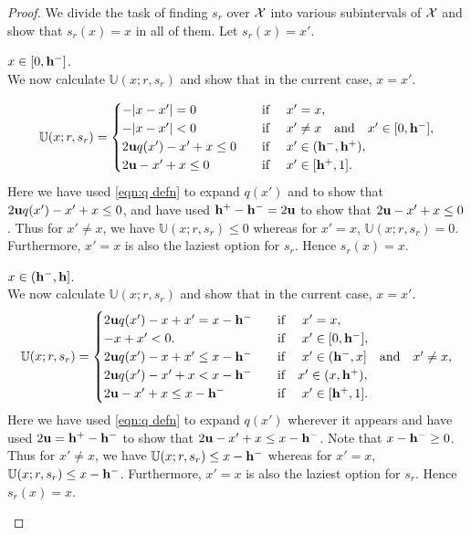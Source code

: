 \begin{proof}\label{proof:error is half}
    We divide the task of finding $ s_r $ over $ \mathcal{X} $ into various subintervals of $ \mathcal{X} $ and show that $s_r(x) = x$ in all of them.  Let $s_r(x) = x'$.

    \begin{case} $ x \in [0,\mathbf{h^{-}}] $.\\
 We now calculate $\mathbb{U}(x;r,s_r)$ and show that in the current case, $x=x'$.

\begin{equation*}
    \mathbb{U}(x;r,s_r) = \begin{cases}
    -|x-x'| = 0 &\hbox{\quad if \quad} x'= x,\\
    -|x-x'| < 0 &\hbox{\quad if \quad} x'\neq x \hbox{\quad and\quad} x' \in [0,\mathbf{h^{-}}],\\
    2\mathbf{u} q(x') - x' + x \leq 0 &\hbox{\quad if \quad} x' \in (\mathbf{h^{-}},\mathbf{h^{+}}),\\
    2\mathbf{u} - x' + x \leq 0&\hbox{\quad if \quad} x' \in [\mathbf{h^{+}},1].
    \end{cases}
\end{equation*}
Here we have used \eqref{eqn:q defn} to expand $q(x')$ and to show that  $2\mathbf{u} q(x') - x' + x \leq 0$, and have used $\mathbf{h^{+}} - \mathbf{h^{-}} = 2\mathbf{u}$ to show that $2\mathbf{u} -x' + x \leq 0$.
Thus for $x' \neq x$, we have $\mathbb{U}(x;r,s_r) \leq 0$ whereas for $x' = x$, $\mathbb{U}(x;r,s_r) = 0$. Furthermore, $x'=x$ is also the laziest option for $s_r$. Hence $s_r(x) = x$.
\end{case}

\begin{case}$ x \in (\mathbf{h^{-}},\mathbf{h}] $.\\
 We now calculate $\mathbb{U}(x;r,s_r)$ and show that in the current case, $x=x'$.
 \begin{equation*}
    \mathbb{U}(x;r,s_r) = \begin{cases}
    2\mathbf{u} q(x') - x + x' = x - \mathbf{h^{-}} &\hbox{\quad if \quad} x'= x,\\
    -x + x' < 0. &\hbox{\quad if \quad} x' \in [0,\mathbf{h^{-}}],\\
    2\mathbf{u} q(x') - x + x' \leq x- \mathbf{h^{-}} &\hbox{\quad if \quad} x' \in (\mathbf{h^{-}},x] \hbox{\quad and\quad} x' \neq x,\\
    2\mathbf{u} q(x') - x' + x < x-\mathbf{h^{-}}    &\hbox{\quad if\quad} x' \in (x,\mathbf{h^{+}}),\\
    2\mathbf{u} - x' + x \leq x - \mathbf{h^{-}} &\hbox{\quad if \quad} x' \in [\mathbf{h^{+}},1].
    \end{cases}
\end{equation*}
Here we have used \eqref{eqn:q defn} to expand $q(x')$ wherever it appears and have used $2\mathbf{u} = \mathbf{h^{+}} - \mathbf{h^{-}}$ to show that $2\mathbf{u} -x' + x \leq x - \mathbf{h^{-}}$. Note that $x - \mathbf{h^{-}} \geq 0$.
Thus for $x' \neq x$, we have $\mathbb{U}(x;r,s_r) \leq x-\mathbf{h^{-}}$ whereas for $x' = x$, $\mathbb{U}(x;r,s_r) \leq x - \mathbf{h^{-}}$. Furthermore, $x'=x$ is also the laziest option for $s_r$. Hence $s_r(x) = x$.
\end{case}


\end{proof}
